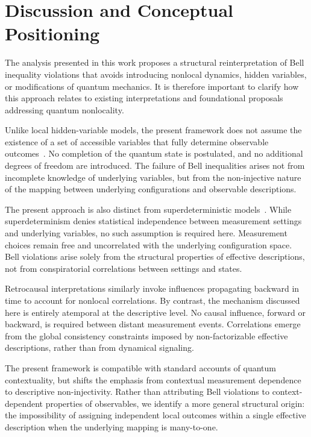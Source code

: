 \section{Discussion and Conceptual Positioning}
  \label{sec:discussion}

  The analysis presented in this work proposes a structural reinterpretation of Bell
  inequality violations that avoids introducing nonlocal dynamics, hidden variables,
  or modifications of quantum mechanics.
  It is therefore important to clarify how this approach relates to existing
  interpretations and foundational proposals addressing quantum nonlocality.

  Unlike local hidden-variable models, the present framework does not assume the
  existence of a set of accessible variables that fully determine observable outcomes~\cite{tHooft2016CAI}.
  No completion of the quantum state is postulated, and no additional degrees of
  freedom are introduced.
  The failure of Bell inequalities arises not from incomplete knowledge of underlying
  variables, but from the non-injective nature of the mapping between underlying
  configurations and observable descriptions.

  The present approach is also distinct from superdeterministic models~\cite{Hall2010LocalDeterministic}.
  While superdeterminism denies statistical independence between measurement settings
  and underlying variables, no such assumption is required here.
  Measurement choices remain free and uncorrelated with the underlying configuration space.
  Bell violations arise solely from the structural properties of effective descriptions,
  not from conspiratorial correlations between settings and states.

  Retrocausal interpretations similarly invoke influences propagating backward in time
  to account for nonlocal correlations.
  By contrast, the mechanism discussed here is entirely atemporal at the descriptive
  level.
  No causal influence, forward or backward, is required between distant measurement
  events.
  Correlations emerge from the global consistency constraints imposed by non-factorizable
  effective descriptions, rather than from dynamical signaling.

  The present framework is compatible with standard accounts of quantum contextuality,
  but shifts the emphasis from contextual measurement dependence to descriptive
  non-injectivity.
  Rather than attributing Bell violations to context-dependent properties of observables,
  we identify a more general structural origin: the impossibility of assigning
  independent local outcomes within a single effective description when the underlying
  mapping is many-to-one.

